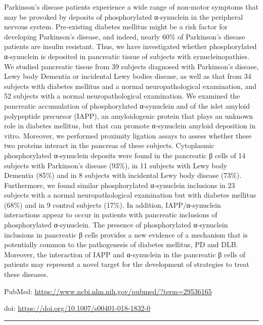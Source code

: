 \documentclass[]{article}
\begin{document}
Parkinson's disease patients experience a wide range of non-motor
symptoms that may be provoked by deposits of phosphorylated α-synuclein
in the peripheral nervous system. Pre-existing diabetes mellitus might
be a risk factor for developing Parkinson's disease, and indeed, nearly
60\% of Parkinson's disease patients are insulin resistant. Thus, we
have investigated whether phosphorylated α-synuclein is deposited in
pancreatic tissue of subjects with synucleinopathies. We studied
pancreatic tissue from 39 subjects diagnosed with Parkinson's disease,
Lewy body Dementia or incidental Lewy bodies disease, as well as that
from 34 subjects with diabetes mellitus and a normal neuropathological
examination, and 52 subjects with a normal neuropathological
examination. We examined the pancreatic accumulation of phosphorylated
α-synuclein and of the islet amyloid polypeptide precursor (IAPP), an
amyloidogenic protein that plays an unknown role in diabetes mellitus,
but that can promote α-synuclein amyloid deposition in vitro. Moreover,
we performed proximity ligation assays to assess whether these two
proteins interact in the pancreas of these subjects. Cytoplasmic
phosphorylated α-synuclein deposits were found in the pancreatic β cells
of 14 subjects with Parkinson's disease (93\%), in 11 subjects with Lewy
body Dementia (85\%) and in 8 subjects with incidental Lewy body disease
(73\%). Furthermore, we found similar phosphorylated α-synuclein
inclusions in 23 subjects with a normal neuropathological examination
but with diabetes mellitus (68\%) and in 9 control subjects (17\%). In
addition, IAPP/α-synuclein interactions appear to occur in patients with
pancreatic inclusions of phosphorylated α-synuclein. The presence of
phosphorylated α-synuclein inclusions in pancreatic β cells provides a
new evidence of a mechanism that is potentially common to the
pathogenesis of diabetes mellitus, PD and DLB. Moreover, the interaction
of IAPP and α-synuclein in the pancreatic β cells of patients may
represent a novel target for the development of strategies to treat
these diseases.

PubMed: \url{https://www.ncbi.nlm.nih.gov/pubmed/?term=29536165}

doi: \url{https://doi.org/10.1007/s00401-018-1832-0}

{}

{}

\begin{center}\rule{0.5\linewidth}{\linethickness}\end{center}
\end{document}

